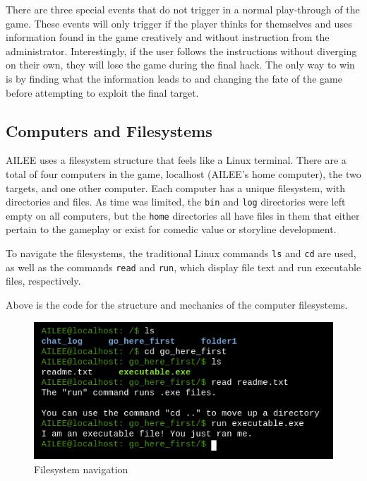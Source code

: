 \documentclass[conference]{IEEEtran}
\begin{document}
There are three special events that do not trigger in a normal play-through of the game. These events will only trigger if the player thinks for themselves and uses information found in the game creatively and without instruction from the administrator. Interestingly, if the user follows the instructions without diverging on their own, they will lose the game during the final hack. The only way to win is by finding what the information leads to and changing the fate of the game before attempting to exploit the final target.

\subsection{Computers and Filesystems}
AILEE uses a filesystem structure that feels like a Linux terminal. There are a total of four computers in the game, localhost (AILEE's home computer), the two targets, and one other computer. Each computer has a unique filesystem, with directories and files. As time was limited, the \texttt{bin} and \texttt{log} directories were left empty on all computers, but the \texttt{home} directories all have files in them that either pertain to the gameplay or exist for comedic value or storyline development.

To navigate the filesystems, the traditional Linux commands \texttt{ls} and \texttt{cd} are used, as well as the commands \texttt{read} and \texttt{run}, which display file text and run executable files, respectively. 



Above is the code for the structure and mechanics of the computer filesystems. 


\begin{figure}[htbp]
	\centerline{\includegraphics[scale=2]{filesystem-example}}
	\caption{Filesystem navigation}
	\label{fig:ls-command}
\end{figure}
\end{document}

